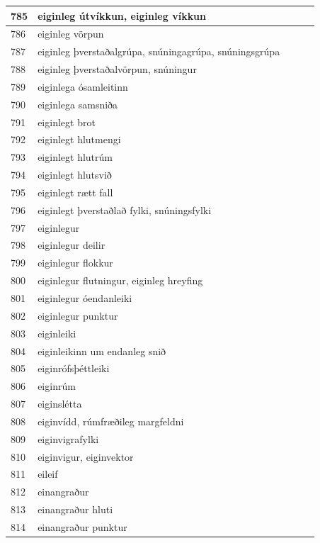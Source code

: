 \begin{longtable}{p{}|p{}|p{}|p{}|p{}}
785 & eiginleg útvíkkun, eiginleg víkkun &  &  &  \\
\hline
786 & eiginleg vörpun &  &  &  \\
\hline
787 & eiginleg þverstaðalgrúpa, snúningagrúpa, snúningsgrúpa &  &  &  \\
\hline
788 & eiginleg þverstaðalvörpun, snúningur &  &  &  \\
\hline
789 & eiginlega ósamleitinn &  &  &  \\
\hline
790 & eiginlega samsniða &  &  &  \\
\hline
791 & eiginlegt brot &  &  &  \\
\hline
792 & eiginlegt hlutmengi &  &  &  \\
\hline
793 & eiginlegt hlutrúm &  &  &  \\
\hline
794 & eiginlegt hlutsvið &  &  &  \\
\hline
795 & eiginlegt rætt fall &  &  &  \\
\hline
796 & eiginlegt þverstaðlað fylki, snúningsfylki &  &  &  \\
\hline
797 & eiginlegur &  &  &  \\
\hline
798 & eiginlegur deilir &  &  &  \\
\hline
799 & eiginlegur flokkur &  &  &  \\
\hline
800 & eiginlegur flutningur, eiginleg hreyfing &  &  &  \\
\hline
801 & eiginlegur óendanleiki &  &  &  \\
\hline
802 & eiginlegur punktur &  &  &  \\
\hline
803 & eiginleiki &  &  & \\
\hline
804 & eiginleikinn um endanleg snið &  &  &  \\
\hline
805 & eiginrófsþéttleiki &  &  &  \\
\hline
806 & eiginrúm &  &  &  \\
\hline
807 & eiginslétta &  &  &  \\
\hline
808 & eiginvídd, rúmfræðileg margfeldni &  &  &  \\
\hline
809 & eiginvigrafylki &  &  &  \\
\hline
810 & eiginvigur, eiginvektor &  &  &  \\
\hline
811 & eileif &  &  &  \\
\hline
812 & einangraður &  &  &  \\
\hline
813 & einangraður hluti &  &  &  \\
\hline
814 & einangraður punktur &  &  &  \\

\end{longtable}
